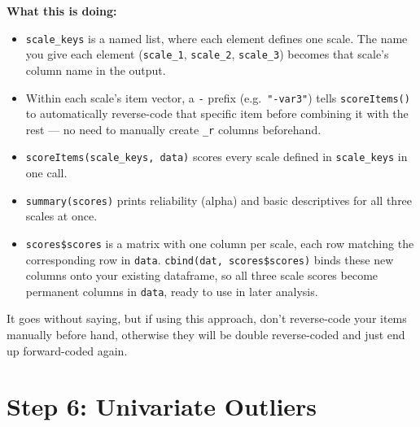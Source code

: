 \documentclass[
  letterpaper,
  DIV=11,
  numbers=noendperiod]{scrreprt}
\begin{document}
\textbf{What this is doing:}

\begin{itemize}
\item
  \texttt{scale\_keys} is a named list, where each element defines one
  scale. The name you give each element (\texttt{scale\_1},
  \texttt{scale\_2}, \texttt{scale\_3}) becomes that scale's column name
  in the output.
\item
  Within each scale's item vector, a \texttt{-} prefix
  (e.g.~\texttt{"-var3"}) tells \texttt{scoreItems()} to automatically
  reverse-code that specific item before combining it with the rest ---
  no need to manually create \texttt{\_r} columns beforehand.
\item
  \texttt{scoreItems(scale\_keys,\ data)} scores every scale defined in
  \texttt{scale\_keys} in one call.
\item
  \texttt{summary(scores)} prints reliability (alpha) and basic
  descriptives for all three scales at once.
\item
  \texttt{scores\$scores} is a matrix with one column per scale, each
  row matching the corresponding row in \texttt{data}.
  \texttt{cbind(dat,\ scores\$scores)} binds these new columns onto your
  existing dataframe, so all three scale scores become permanent columns
  in \texttt{data}, ready to use in later analysis.
\end{itemize}

\begin{tcolorbox}[enhanced jigsaw, toprule=.15mm, coltitle=black, colframe=quarto-callout-note-color-frame, colbacktitle=quarto-callout-note-color!10!white, opacityback=0, left=2mm, breakable, rightrule=.15mm, bottomrule=.15mm, leftrule=.75mm, titlerule=0mm, arc=.35mm, opacitybacktitle=0.6, toptitle=1mm, bottomtitle=1mm, title=\textcolor{quarto-callout-note-color}{\faInfo}\hspace{0.5em}{Note}, colback=white]

It goes without saying, but if using this approach, don't reverse-code
your items manually before hand, otherwise they will be double
reverse-coded and just end up forward-coded again.

\end{tcolorbox}

\section{Step 6: Univariate Outliers}\label{step-6-univariate-outliers}
\end{document}
